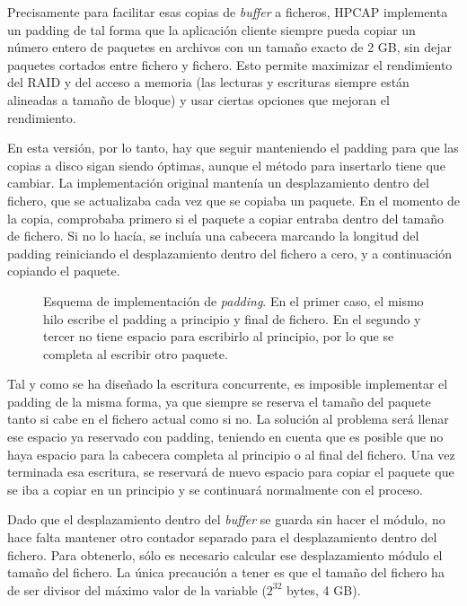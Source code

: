 \documentclass[twoside, 12pt]{epstfg}
\begin{document}
Precisamente para facilitar esas copias de \textit{buffer} a ficheros, HPCAP implementa un \gls{padding} \cite{MorenoTFM2012} de tal forma que la aplicación cliente siempre pueda copiar un número entero de paquetes en archivos con un tamaño exacto de 2 GB, sin dejar paquetes cortados entre fichero y fichero. Esto permite maximizar el rendimiento del \gls{RAID} y del acceso a memoria (las lecturas y escrituras siempre están alineadas a tamaño de bloque) y usar ciertas opciones que mejoran el rendimiento.

En esta versión, por lo tanto, hay que seguir manteniendo el \gls{padding} para que las copias a disco sigan siendo óptimas, aunque el método para insertarlo tiene que cambiar. La implementación original mantenía un desplazamiento dentro del fichero, que se actualizaba cada vez que se copiaba un paquete. En el momento de la copia, comprobaba primero si el paquete a copiar entraba dentro del tamaño de fichero. Si no lo hacía, se incluía una cabecera marcando la longitud del \gls{padding} reiniciando el desplazamiento dentro del fichero a cero, y a continuación copiando el paquete.

\begin{figure}[tbp]
\centering

\caption[Esquema de implementación del \textit{padding} en el \textit{buffer} intermedio]{Esquema de implementación de \textit{padding}. En el primer caso, el mismo hilo escribe el \gls{padding} a principio y final de fichero. En el segundo y tercer no tiene espacio para escribirlo al principio, por lo que se completa al escribir otro paquete.}
\label{fig:BufferPadding}
\end{figure}

Tal y como se ha diseñado la escritura concurrente, es imposible implementar el \gls{padding} de la misma forma, ya que siempre se reserva el tamaño del paquete tanto si cabe en el fichero actual como si no. La solución al problema será llenar ese espacio ya reservado con \gls{padding}, teniendo en cuenta que es posible que no haya espacio para la cabecera completa al principio o al final del fichero. Una vez terminada esa escritura, se reservará de nuevo espacio para copiar el paquete que se iba a copiar en un principio y se continuará normalmente con el proceso.

Dado que el desplazamiento dentro del \textit{buffer} se guarda sin hacer el módulo, no hace falta mantener otro contador separado para el desplazamiento dentro del fichero. Para obtenerlo, sólo es necesario calcular ese desplazamiento módulo el tamaño del fichero. La única precaución a tener es que el tamaño del fichero ha de ser divisor del máximo valor de la variable ($2^{32}$ bytes, 4 GB).
\end{document}
